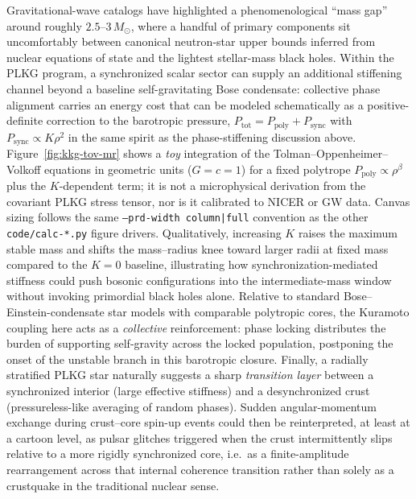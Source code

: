 Gravitational-wave catalogs have highlighted a phenomenological ``mass gap'' around roughly $2.5$--$3\,M_\odot$, where a handful of primary components sit uncomfortably between canonical neutron-star upper bounds inferred from nuclear equations of state and the lightest stellar-mass black holes.
Within the PLKG program, a synchronized scalar sector can supply an additional stiffening channel beyond a baseline self-gravitating Bose condensate: collective phase alignment carries an energy cost that can be modeled schematically as a positive-definite correction to the barotropic pressure, $P_{\mathrm{tot}}=P_{\mathrm{poly}}+P_{\mathrm{sync}}$ with $P_{\mathrm{sync}}\propto K\rho^2$ in the same spirit as the phase-stiffening discussion above.
Figure~\ref{fig:kkg-tov-mr} shows a \emph{toy} integration of the Tolman--Oppenheimer--Volkoff equations in geometric units ($G=c=1$) for a fixed polytrope $P_{\mathrm{poly}}\propto\rho^{\beta}$ plus the $K$-dependent term; it is not a microphysical derivation from the covariant PLKG stress tensor, nor is it calibrated to NICER or GW data.
Canvas sizing follows the same \texttt{--prd-width column|full} convention as the other \texttt{code/calc-*.py} figure drivers.
Qualitatively, increasing $K$ raises the maximum stable mass and shifts the mass--radius knee toward larger radii at fixed mass compared to the $K=0$ baseline, illustrating how synchronization-mediated stiffness could push bosonic configurations into the intermediate-mass window without invoking primordial black holes alone.
Relative to standard Bose--Einstein-condensate star models with comparable polytropic cores, the Kuramoto coupling here acts as a \emph{collective} reinforcement: phase locking distributes the burden of supporting self-gravity across the locked population, postponing the onset of the unstable branch in this barotropic closure.
Finally, a radially stratified PLKG star naturally suggests a sharp \emph{transition layer} between a synchronized interior (large effective stiffness) and a desynchronized crust (pressureless-like averaging of random phases).
Sudden angular-momentum exchange during crust--core spin-up events could then be reinterpreted, at least at a cartoon level, as pulsar glitches triggered when the crust intermittently slips relative to a more rigidly synchronized core, i.e.\ as a finite-amplitude rearrangement across that internal coherence transition rather than solely as a crustquake in the traditional nuclear sense.


